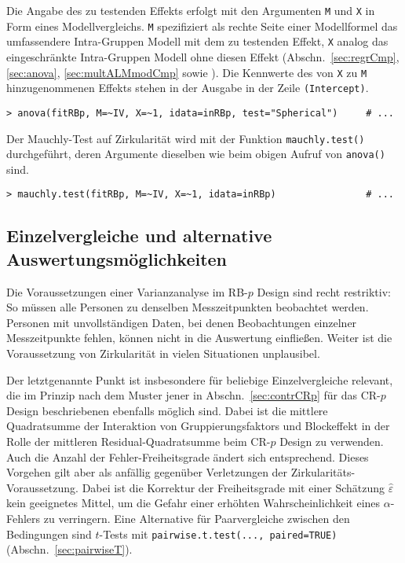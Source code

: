 Die Angabe des zu testenden Effekts erfolgt mit den Argumenten \lstinline!M! und \lstinline!X! in Form eines Modellvergleichs. \lstinline!M! spezifiziert als rechte Seite einer Modellformel das umfassendere Intra-Gruppen Modell mit dem zu testenden Effekt, \lstinline!X! analog das eingeschränkte Intra-Gruppen Modell ohne diesen Effekt (Abschn.\ \ref{sec:regrCmp}, \ref{sec:anova}, \ref{sec:multALMmodCmp} sowie ). Die Kennwerte des von \lstinline!X! zu \lstinline!M! hinzugenommenen Effekts stehen in der Ausgabe in der Zeile \lstinline!(Intercept)!.
\begin{lstlisting}
> anova(fitRBp, M=~IV, X=~1, idata=inRBp, test="Spherical")     # ...
\end{lstlisting}

Der Mauchly-Test auf Zirkularität wird mit der Funktion  \lstinline!mauchly.test()! durchgeführt, deren Argumente dieselben wie beim obigen Aufruf von \lstinline!anova()! sind.
\begin{lstlisting}
> mauchly.test(fitRBp, M=~IV, X=~1, idata=inRBp)                # ...
\end{lstlisting}

\subsection{Einzelvergleiche und alternative Auswertungsmöglichkeiten}
\label{sec:contrRBp}

Die Voraussetzungen einer Varianzanalyse im RB-$p$ Design sind recht restriktiv: So müssen alle Personen zu denselben Messzeitpunkten beobachtet werden. Personen mit unvollständigen Daten, bei denen Beobachtungen einzelner Messzeitpunkte fehlen, können nicht in die Auswertung einfließen. Weiter ist die Voraussetzung von Zirkularität in vielen Situationen unplausibel.

Der letztgenannte Punkt ist insbesondere für beliebige Einzelvergleiche relevant, die im Prinzip nach dem Muster jener in Abschn.\ \ref{sec:contrCRp} für das CR-$p$ Design beschriebenen ebenfalls möglich sind. Dabei ist die mittlere Quadratsumme der Interaktion von Gruppierungsfaktors und Blockeffekt in der Rolle der mittleren Residual-Quadratsumme beim CR-$p$ Design zu verwenden. Auch die Anzahl der Fehler-Freiheitsgrade ändert sich entsprechend. Dieses Vorgehen gilt aber als anfällig gegenüber Verletzungen der Zirkularitäts-Voraussetzung. Dabei ist die Korrektur der Freiheitsgrade mit einer Schätzung $\hat{\varepsilon}$ kein geeignetes Mittel, um die Gefahr einer erhöhten Wahrscheinlichkeit eines $\alpha$-Fehlers zu verringern. Eine Alternative für Paarvergleiche zwischen den Bedingungen sind $t$-Tests mit \lstinline!pairwise.t.test(..., paired=TRUE)! (Abschn.\ \ref{sec:pairwiseT}).

